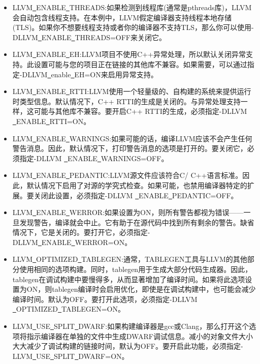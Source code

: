 \begin{itemize}
	\item LLVM\underline{~}ENABLE\underline{~}THREADS:如果检测到线程库(通常是pthreads库)，LLVM会自动包含线程支持。在本例中，LLVM假定编译器支持线程本地存储(TLS)。如果你不想要线程支持或者你的编译器不支持TLS，那么你可以使用-DLLVM\underline{~}ENABLE\underline{~}THREADS=OFF来关闭它。
	
	\item LLVM\underline{~}ENABLE\underline{~}EH:LLVM项目不使用C++异常处理，所以默认关闭异常支持。此设置可能与您的项目正在链接的其他库不兼容。如果需要，可以通过指定-DLLVM\underline{~}enable\underline{~}EH=ON来启用异常支持。
	
	\item LLVM\underline{~}ENABLE\underline{~}RTTI:LLVM使用一个轻量级的、自构建的系统来提供运行时类型信息。默认情况下，C++ RTTI的生成是关闭的。与异常处理支持一样，这可能与其他库不兼容。要开启C++ RTTI的生成，必须指定-DLLVM \underline{~}ENABLE\underline{~}RTTI=ON。
	
	\item LLVM\underline{~}ENABLE\underline{~}WARNINGS:如果可能的话，编译LLVM应该不会产生任何警告消息。因此，默认情况下，打印警告消息的选项是打开的。要关闭它，必须指定-DLLVM \underline{~}ENABLE\underline{~}WARNINGS=OFF。
	
	\item LLVM\underline{~}ENABLE\underline{~}PEDANTIC:LLVM源文件应该符合C/ C++语言标准。因此，默认情况下启用了对源的学究式检查。如果可能，也禁用编译器特定的扩展。要关闭此设置，必须指定-DLLVM \underline{~}ENABLE\underline{~}PEDANTIC=OFF。
	
	\item LLVM\underline{~}ENABLE\underline{~}WERROR:如果设置为ON，则所有警告都视为错误——一旦发现警告，编译就会中止。它有助于在源代码中找到所有剩余的警告。缺省情况下，它是关闭的。要打开它，必须指定-DLLVM\underline{~}ENABLE\underline{~}WERROR=ON。
	
	\item LLVM\underline{~}OPTIMIZED\underline{~}TABLEGEN:通常，TABLEGEN工具与LLVM的其他部分使用相同的选项构建。同时，tablegen用于生成大部分代码生成器。因此，tablegen在调试构建中要慢得多，从而显著增加了编译时间。如果将此选项设置为ON，则tablegen编译时会启用优化，即使是在调试构建中，也可能会减少编译时间。默认为OFF。要打开此选项，必须指定-DLLVM \underline{~}OPTIMIZED\underline{~}TABLEGEN=ON。
	
	\item LLVM\underline{~}USE\underline{~}SPLIT\underline{~}DWARF:如果构建编译器是gcc或Clang，那么打开这个选项将指示编译器在单独的文件中生成DWARF调试信息。减小的对象文件大小大大减少了调试构建的链接时间，默认为OFF。要开启此功能，必须指定-LLVM\underline{~}USE\underline{~}SPLIT\underline{~}DWARF=ON。

\end{itemize}

